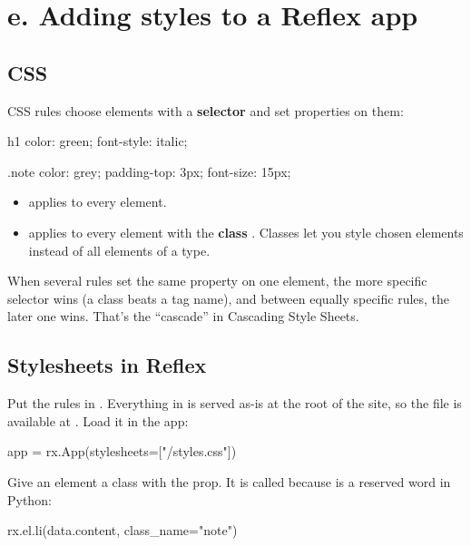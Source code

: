 \section{e. Adding styles to a Reflex app}

\subsection{CSS}

CSS rules choose elements with a \textbf{selector} and set properties on them:

\begin{code}
h1 {
    color: green;
    font-style: italic;
}

.note {
    color: grey;
    padding-top: 3px;
    font-size: 15px;
}
\end{code}

\begin{itemize}
\item {} applies to every  element.
\item {} applies to every element with the \textbf{class} . Classes let you style chosen elements instead of all elements of a type.
\end{itemize}

When several rules set the same property on one element, the more specific selector wins (a class beats a tag name), and between equally specific rules, the later one wins. That's the ``cascade'' in Cascading Style Sheets.

\subsection{Stylesheets in Reflex}

Put the rules in . Everything in  is served as-is at the root of the site, so the file is available at . Load it in the app:

\begin{py}
app = rx.App(stylesheets=["/styles.css"])
\end{py}

Give an element a class with the  prop. It is called  because  is a reserved word in Python:

\begin{py}
rx.el.li(data.content, class_name="note")
\end{py}

